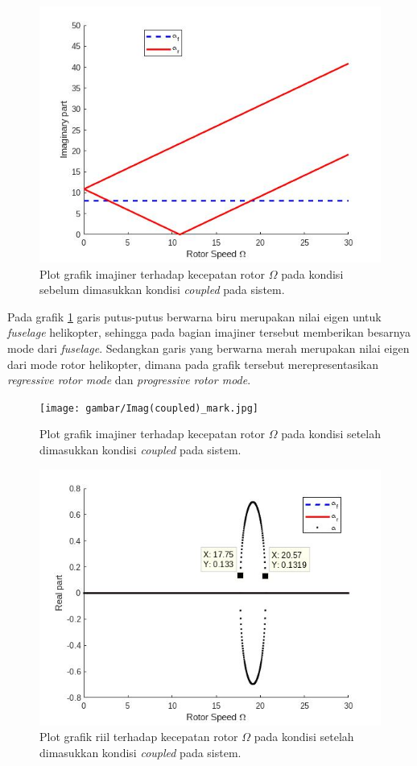 \begin{figure}[H]
	\centering
	\includegraphics[width=0.7\linewidth]{gambar/Imag(uncoupled).jpg}
	\caption{Plot grafik imajiner terhadap kecepatan rotor $\Omega$ pada kondisi sebelum dimasukkan kondisi \textit{coupled} pada sistem.}
	\label{fig:imag(uncoupled)}
\end{figure}

Pada grafik \ref{fig:imag(uncoupled)} garis putus-putus berwarna biru merupakan nilai eigen untuk \textit{fuselage} helikopter, sehingga pada bagian imajiner tersebut memberikan besarnya mode dari \textit{fuselage}. Sedangkan garis yang berwarna merah merupakan nilai eigen dari mode rotor helikopter, dimana pada grafik tersebut merepresentasikan \textit{regressive rotor mode} dan \textit{progressive rotor mode}. 

\begin{figure}[H]
	\centering
	\texttt{[image: gambar/Imag(coupled)\_mark.jpg]}
	\caption{Plot grafik imajiner terhadap kecepatan rotor $\Omega$ pada kondisi setelah dimasukkan kondisi \textit{coupled} pada sistem.}
	\label{fig:imag(coupled)}
\end{figure}

\begin{figure}[H]
	\centering
	\includegraphics[width=0.7\linewidth]{gambar/Real(coupled).jpg}
	\caption{Plot grafik riil terhadap kecepatan rotor $\Omega$ pada kondisi setelah dimasukkan kondisi \textit{coupled} pada sistem.}
	\label{fig:real(coupled)}
\end{figure}

